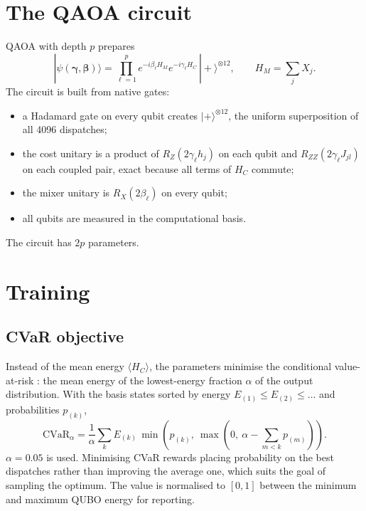 \section{The QAOA circuit}
QAOA with depth $p$ prepares
\begin{equation}
|\psi(\boldsymbol\gamma, \boldsymbol\beta)\rangle = \prod_{\ell=1}^{p} e^{-i\beta_\ell H_M} e^{-i\gamma_\ell H_C} \, |+\rangle^{\otimes 12}, \qquad H_M = \sum_j X_j.
\end{equation}
The circuit is built from native gates:
\begin{itemize}
\item a Hadamard gate on every qubit creates $|+\rangle^{\otimes 12}$, the uniform superposition of all 4096 dispatches;
\item the cost unitary is a product of $R_Z(2\gamma_\ell h_j)$ on each qubit and $R_{ZZ}(2\gamma_\ell J_{jl})$ on each coupled pair, exact because all terms of $H_C$ commute;
\item the mixer unitary is $R_X(2\beta_\ell)$ on every qubit;
\item all qubits are measured in the computational basis.
\end{itemize}
The circuit has $2p$ parameters.

\section{Training}
\subsection{CVaR objective}
Instead of the mean energy $\langle H_C \rangle$, the parameters minimise the conditional value-at-risk \cite{barkoutsos2020}: the mean energy of the lowest-energy fraction $\alpha$ of the output distribution. With the basis states sorted by energy $E_{(1)} \le E_{(2)} \le \dots$ and probabilities $p_{(k)}$,
\begin{equation}
\mathrm{CVaR}_\alpha = \frac{1}{\alpha} \sum_k E_{(k)} \, \min\!\left( p_{(k)},\ \max\!\left(0,\ \alpha - \textstyle\sum_{m<k} p_{(m)}\right) \right).
\end{equation}
$\alpha = 0.05$ is used. Minimising CVaR rewards placing probability on the best dispatches rather than improving the average one, which suits the goal of sampling the optimum. The value is normalised to $[0, 1]$ between the minimum and maximum QUBO energy for reporting.

